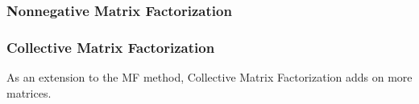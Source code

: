 
\subsubsection{Nonnegative Matrix Factorization}


\subsubsection{Collective Matrix Factorization}
As an extension to the MF method, Collective Matrix Factorization adds on more matrices.

